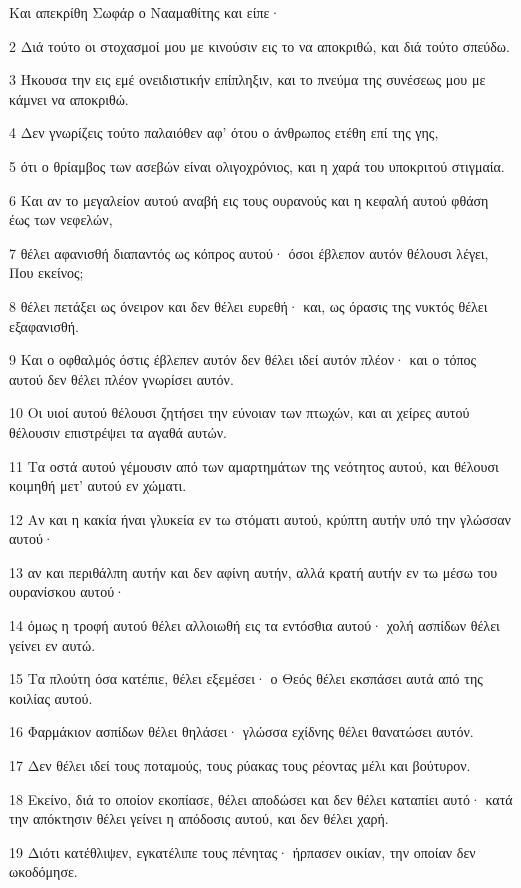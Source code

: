 \par Και απεκρίθη Σωφάρ ο Νααμαθίτης και είπε·
\par 2 Διά τούτο οι στοχασμοί μου με κινούσιν εις το να αποκριθώ, και διά τούτο σπεύδω.
\par 3 Ήκουσα την εις εμέ ονειδιστικήν επίπληξιν, και το πνεύμα της συνέσεως μου με κάμνει να αποκριθώ.
\par 4 Δεν γνωρίζεις τούτο παλαιόθεν αφ' ότου ο άνθρωπος ετέθη επί της γης,
\par 5 ότι ο θρίαμβος των ασεβών είναι ολιγοχρόνιος, και η χαρά του υποκριτού στιγμαία.
\par 6 Και αν το μεγαλείον αυτού αναβή εις τους ουρανούς και η κεφαλή αυτού φθάση έως των νεφελών,
\par 7 θέλει αφανισθή διαπαντός ως κόπρος αυτού· όσοι έβλεπον αυτόν θέλουσι λέγει, Που εκείνος;
\par 8 θέλει πετάξει ως όνειρον και δεν θέλει ευρεθή· και, ως όρασις της νυκτός θέλει εξαφανισθή.
\par 9 Και ο οφθαλμός όστις έβλεπεν αυτόν δεν θέλει ιδεί αυτόν πλέον· και ο τόπος αυτού δεν θέλει πλέον γνωρίσει αυτόν.
\par 10 Οι υιοί αυτού θέλουσι ζητήσει την εύνοιαν των πτωχών, και αι χείρες αυτού θέλουσιν επιστρέψει τα αγαθά αυτών.
\par 11 Τα οστά αυτού γέμουσιν από των αμαρτημάτων της νεότητος αυτού, και θέλουσι κοιμηθή μετ' αυτού εν χώματι.
\par 12 Αν και η κακία ήναι γλυκεία εν τω στόματι αυτού, κρύπτη αυτήν υπό την γλώσσαν αυτού·
\par 13 αν και περιθάλπη αυτήν και δεν αφίνη αυτήν, αλλά κρατή αυτήν εν τω μέσω του ουρανίσκου αυτού·
\par 14 όμως η τροφή αυτού θέλει αλλοιωθή εις τα εντόσθια αυτού· χολή ασπίδων θέλει γείνει εν αυτώ.
\par 15 Τα πλούτη όσα κατέπιε, θέλει εξεμέσει· ο Θεός θέλει εκσπάσει αυτά από της κοιλίας αυτού.
\par 16 Φαρμάκιον ασπίδων θέλει θηλάσει· γλώσσα εχίδνης θέλει θανατώσει αυτόν.
\par 17 Δεν θέλει ιδεί τους ποταμούς, τους ρύακας τους ρέοντας μέλι και βούτυρον.
\par 18 Εκείνο, διά το οποίον εκοπίασε, θέλει αποδώσει και δεν θέλει καταπίει αυτό· κατά την απόκτησιν θέλει γείνει η απόδοσις αυτού, και δεν θέλει χαρή.
\par 19 Διότι κατέθλιψεν, εγκατέλιπε τους πένητας· ήρπασεν οικίαν, την οποίαν δεν ωκοδόμησε.

